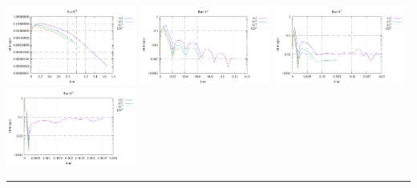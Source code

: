 \begin{center}
\includegraphics[width=4.297cm]{python_codes/fieldstone_155/results/conv_omega_Ra1e3}
\includegraphics[width=4.297cm]{python_codes/fieldstone_155/results/conv_omega_Ra1e4}
\includegraphics[width=4.297cm]{python_codes/fieldstone_155/results/conv_omega_Ra1e5}
\includegraphics[width=4.297cm]{python_codes/fieldstone_155/results/conv_omega_Ra1e6}\\
\end{center}

\par\noindent\rule{\textwidth}{0.4pt}

\vspace{.5cm}

\begin{center}
\end{center}


